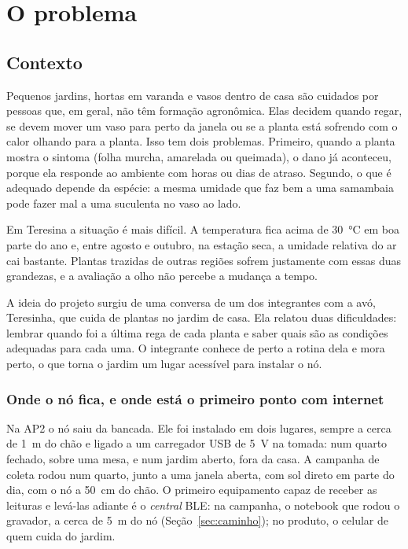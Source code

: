 \chapter{O problema}
\label{cap:problema}
\rubricaJustificativa

\section{Contexto}

Pequenos jardins, hortas em varanda e vasos dentro de casa são cuidados
por pessoas que, em geral, não têm formação agronômica. Elas decidem
quando regar, se devem mover um vaso para perto da janela ou se a planta
está sofrendo com o calor olhando para a planta. Isso tem dois problemas.
Primeiro, quando a planta mostra o sintoma (folha murcha, amarelada ou
queimada), o dano já aconteceu, porque ela responde ao ambiente com horas
ou dias de atraso. Segundo, o que é adequado depende da espécie: a mesma
umidade que faz bem a uma samambaia pode fazer mal a uma suculenta no
vaso ao lado.

Em Teresina a situação é mais difícil. A temperatura fica acima de
\SI{30}{\celsius} em boa parte do ano e, entre agosto e outubro, na
estação seca, a umidade relativa do ar cai bastante. Plantas trazidas de
outras regiões sofrem justamente com essas duas grandezas, e a avaliação
a olho não percebe a mudança a tempo.

A ideia do projeto surgiu de uma conversa de um dos integrantes com a
avó, Teresinha, que cuida de plantas no jardim de casa. Ela relatou duas
dificuldades: lembrar quando foi a última rega de cada planta e saber
quais são as condições adequadas para cada uma. O integrante conhece de
perto a rotina dela e mora perto, o que torna o jardim um lugar acessível
para instalar o nó.

\subsection*{Onde o nó fica, e onde está o primeiro ponto com internet}

Na AP2 o nó saiu da bancada. Ele foi instalado em dois lugares, sempre a
cerca de \SI{1}{\metre} do chão e ligado a um carregador USB de
\SI{5}{\volt} na tomada: num quarto fechado, sobre uma mesa, e num jardim
aberto, fora da casa. A campanha de coleta rodou num quarto, junto a uma janela aberta, com sol direto em parte do dia, com o nó a \SI{50}{\centi\metre} do chão. O primeiro equipamento capaz de receber as
leituras e levá-las adiante é o \emph{central} BLE: na campanha, o
notebook que rodou o gravador, a cerca de \SI{5}{\metre} do nó
(Seção~\ref{sec:caminho}); no produto, o celular de quem cuida do jardim.


